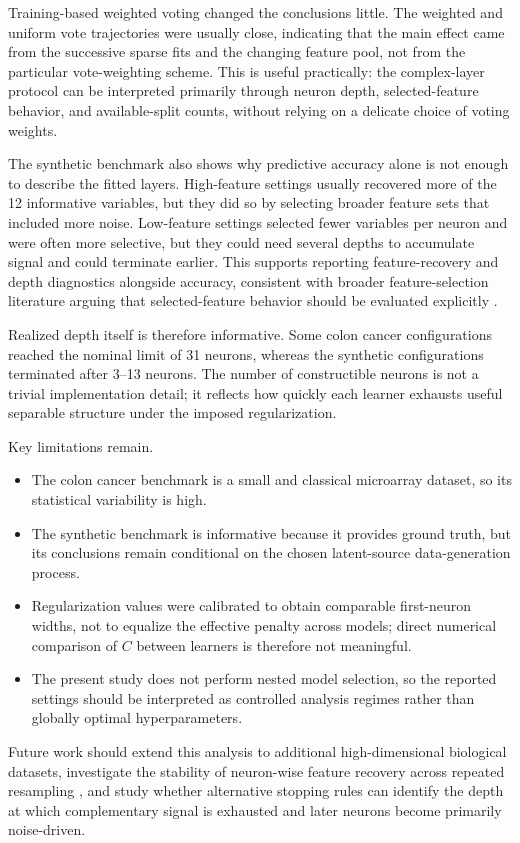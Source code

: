 Training-based weighted voting changed the conclusions little.
The weighted and uniform vote trajectories were usually close, indicating that the main effect came from the
successive sparse fits and the changing feature pool, not from the particular vote-weighting scheme.
This is useful practically: the complex-layer protocol can be interpreted primarily through neuron depth,
selected-feature behavior, and available-split counts, without relying on a delicate choice of voting weights.

The synthetic benchmark also shows why predictive accuracy alone is not enough to describe the fitted layers.
High-feature settings usually recovered more of the 12 informative variables, but they did so by selecting
broader feature sets that included more noise.
Low-feature settings selected fewer variables per neuron and were often more selective, but they could need
several depths to accumulate signal and could terminate earlier.
This supports reporting feature-recovery and depth diagnostics alongside accuracy, consistent with broader
feature-selection literature arguing that selected-feature behavior should be evaluated explicitly
\cite{saeys2007review,nogueira2018stability,lukaszuk2024importance}.

Realized depth itself is therefore informative.
Some colon cancer configurations reached the nominal limit of 31 neurons, whereas the synthetic configurations
terminated after 3--13 neurons.
The number of constructible neurons is not a trivial implementation detail; it reflects how quickly each learner
exhausts useful separable structure under the imposed regularization.

Key limitations remain.
\begin{itemize}[noitemsep]
\item The colon cancer benchmark is a small and classical microarray dataset, so its statistical variability is
high.
\item The synthetic benchmark is informative because it provides ground truth, but its conclusions remain
conditional on the chosen latent-source data-generation process.
\item Regularization values were calibrated to obtain comparable first-neuron widths, not to equalize the
effective penalty across models; direct numerical comparison of $C$ between learners is therefore not
meaningful.
\item The present study does not perform nested model selection, so the reported settings should be interpreted
as controlled analysis regimes rather than globally optimal hyperparameters.
\end{itemize}

Future work should extend this analysis to additional high-dimensional biological datasets, investigate the
stability of neuron-wise feature recovery across repeated resampling \cite{lukaszuk2024importance}, and study whether alternative stopping
rules can identify the depth at which complementary signal is exhausted and later neurons become primarily
noise-driven.
